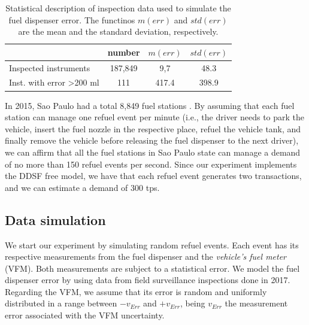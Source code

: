 \documentclass[sigplan]{acmart}
\begin{document}
\begin{table}[t!]
\centering
\caption{Statistical description of inspection data used to simulate the fuel dispenser error. The functinos $m(err)$ and $std(err)$ are the mean and the standard deviation, respectively.}
\label{t:dataset}
\begin{tabular}{|l|c|c|c|}
\hline
\textbf{}                                  & \multicolumn{1}{l|}{\textbf{number}} & \multicolumn{1}{l|}{\textbf{$m(err)$}} & \multicolumn{1}{l|}{\textbf{$std(err)$}} \\ \hline
Inspected instruments              & 187,849                                      & 9,7                                    & 48.3                                     \\ \hline
Inst. with error \textgreater 200 ml & 111                                          & 417.4                                  & 398.9                                    \\ \hline
\end{tabular}
\end{table}

In 2015, Sao Paulo had a total 8,849 fuel stations \cite{Beteto2016}.
By assuming that each fuel station can manage one refuel event per minute (i.e., the driver needs to park the vehicle, insert the fuel nozzle in the respective place, refuel the vehicle tank, and finally remove the vehicle before releasing the fuel dispenser to the next driver), we can affirm that all the fuel stations in Sao Paulo state can manage a demand of no more than 150 refuel events per second.
Since our experiment implements the DDSF free model, we have that each refuel event generates two transactions, and we can estimate a demand of 300 tps.

\subsection{Data simulation}
We start our experiment by simulating random refuel events.
Each event has its respective measurements from the fuel dispenser and the \emph{vehicle's fuel meter} (VFM).
Both measurements are subject to a statistical error.
We model the fuel dispenser error by using data from field surveillance inspections done in 2017.
Regarding the VFM, we assume that its error is random and uniformly distributed in a range between $-v_{Err}$ and $+v_{Err}$, being $v_{Err}$ the measurement error associated with the VFM uncertainty.
\end{document}
